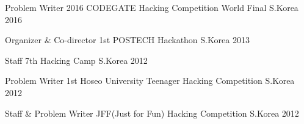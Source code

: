 
{%
\renewcommand{\acvSectionContentTopSkip}{2.5mm}%
\renewcommand{\arraystretch}{1.00}%
\begin{cvhonors}
  \cvhonor
    {Problem Writer}
    {2016 CODEGATE Hacking Competition World Final}
    {S.Korea}
    {2016}

  \cvhonor
    {Organizer \& Co-director}
    {1st POSTECH Hackathon}
    {S.Korea}
    {2013}

  \cvhonor
    {Staff}
    {7th Hacking Camp}
    {S.Korea}
    {2012}

  \cvhonor
    {Problem Writer}
    {1st Hoseo University Teenager Hacking Competition}
    {S.Korea}
    {2012}

  \cvhonor
    {Staff \& Problem Writer}
    {JFF(Just for Fun) Hacking Competition}
    {S.Korea}
    {2012}
\end{cvhonors}
}
